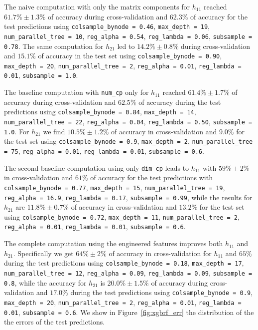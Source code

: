     The naive computation with only the matrix components for $h_{11}$ reached $61.7\% \pm 1.3\%$ of accuracy during cross-validation and $62.3\%$ of accuracy for the test predictions using \texttt{colsample\_bynode = 0.46}, \texttt{max\_depth = 19}, \texttt{num\_parallel\_tree = 10}, \texttt{reg\_alpha = 0.54}, \texttt{reg\_lambda = 0.06}, \texttt{subsample = 0.78}. The same computation for $h_{21}$ led to $14.2\% \pm 0.8\%$ during cross-validation and $15.1\%$ of accuracy in the test set using \texttt{colsample\_bynode = 0.90}, \texttt{max\_depth = 20}, \texttt{num\_parallel\_tree = 2}, \texttt{reg\_alpha = 0.01}, \texttt{reg\_lambda = 0.01}, \texttt{subsample = 1.0}.
    
    The baseline computation with \texttt{num\_cp} only for $h_{11}$ reached $61.4\% \pm 1.7\%$ of accuracy during cross-validation and $62.5\%$ of accuracy during the test predictions using \texttt{colsample\_bynode = 0.84}, \texttt{max\_depth = 14}, \texttt{num\_parallel\_tree = 22}, \texttt{reg\_alpha = 0.04}, \texttt{reg\_lambda = 0.50}, \texttt{subsample = 1.0}. For $h_{21}$ we find $10.5\% \pm 1.2\%$ of accuracy in cross-validation and $9.0\%$ for the test set using \texttt{colsample\_bynode = 0.9}, \texttt{max\_depth = 2}, \texttt{num\_parallel\_tree = 75}, \texttt{reg\_alpha = 0.01}, \texttt{reg\_lambda = 0.01}, \texttt{subsample = 0.6}.
    
    The second baseline computation using only \texttt{dim\_cp} leads to $h_{11}$ with $59\% \pm 2\%$ in cross-validation and $61\%$ of accuracy for the test predictions with \texttt{colsample\_bynode = 0.77}, \texttt{max\_depth = 15}, \texttt{num\_parallel\_tree = 19}, \texttt{reg\_alpha = 16.9}, \texttt{reg\_lambda = 0.17}, \texttt{subsample = 0.99}, while the results for $h_{21}$ are $11.8\% \pm 0.7\%$ of accuracy in cross-validation and $13.2\%$ for the test set using \texttt{colsample\_bynode = 0.72}, \texttt{max\_depth = 11}, \texttt{num\_parallel\_tree = 2}, \texttt{reg\_alpha = 0.01}, \texttt{reg\_lambda = 0.01}, \texttt{subsample = 0.6}.
    
    The complete computation using the engineered features improves both $h_{11}$ and $h_{21}$. Specifically we get $64\% \pm 2\%$ of accuracy in cross-validation for $h_{11}$ and $65\%$ during the test predictions using \texttt{colsample\_bynode = 0.18}, \texttt{max\_depth = 17}, \texttt{num\_parallel\_tree = 12}, \texttt{reg\_alpha = 0.09}, \texttt{reg\_lambda = 0.09}, \texttt{subsample = 0.8}, while the accuracy for $h_{21}$ is $20.0\% \pm 1.5\%$ of accuracy during cross-validation and $17.0\%$ during the test predictions using \texttt{colsample\_bynode = 0.9}, \texttt{max\_depth = 20}, \texttt{num\_parallel\_tree = 2}, \texttt{reg\_alpha = 0.01}, \texttt{reg\_lambda = 0.01}, \texttt{subsample = 0.6}. We show in Figure~\ref{fig:xgbrf_err} the distribution of the the errors of the test predictions.
    
